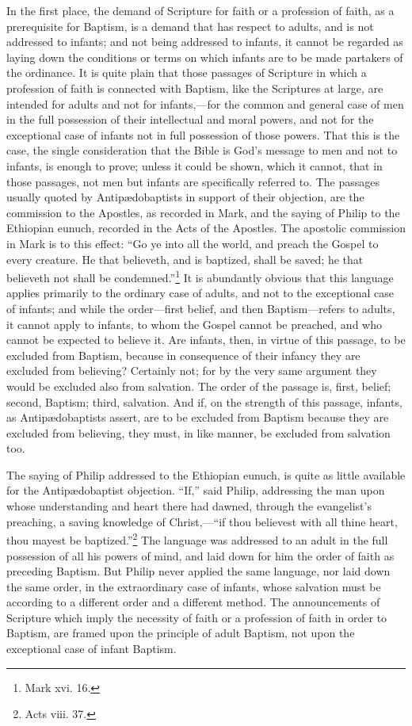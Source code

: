\documentclass[english,]{book}
\begin{document}
In the first place, the demand of Scripture for faith or a profession of faith, as a prerequisite for Baptism, is a demand that has respect to adults, and is not addressed to infants; and not being addressed to infants, it cannot be regarded as laying down the conditions or terms on which infants are to be made partakers of the ordinance. It is quite plain that those passages of Scripture in which a profession of faith is connected with Baptism, like the Scriptures at large, are intended for adults and not for infants,---for the common and general case of men in the full possession of their intellectual and moral powers, and not for the exceptional case of infants not in full possession of those powers. That this is the case, the single consideration that the Bible is God's message to men and not to infants, is enough to prove; unless it could be shown, which it cannot, that in those passages, not men but infants are specifically referred to. The passages usually quoted by Antipædobaptists in support of their objection, are the commission to the Apostles, as recorded in Mark, and the saying of Philip to the Ethiopian eunuch, recorded in the Acts of the Apostles. The apostolic commission in Mark is to this effect: ``Go ye into all the world, and preach the Gospel to every creature. He that believeth, and is baptized, shall be saved; he that believeth not shall be condemned.''\footnote{Mark xvi. 16.} It is abundantly obvious that this language applies primarily to the ordinary case of adults, and not to the exceptional case of infants; and while the order---first belief, and then Baptism---refers to adults, it cannot apply to infants, to whom the Gospel cannot be preached, and who cannot be expected to believe it. Are infants, then, in virtue of this passage, to be excluded from Baptism, because in consequence of their infancy they are excluded from believing? Certainly not; for by the very same argument they would be excluded also from salvation. The order of the passage is, first, belief; second, Baptism; third, salvation. And if, on the strength of this passage, infants, as Antipædobaptists assert, are to be excluded from Baptism because they are excluded from believing, they must, in like manner, be excluded from salvation too.

The saying of Philip addressed to the Ethiopian eunuch, is quite as little available for the Antipædobaptist objection. ``If,'' said Philip, addressing the man upon whose understanding and heart there had dawned, through the evangelist's preaching, a saving knowledge of Christ,---``if thou believest with all thine heart, thou mayest be baptized.''\footnote{Acts viii. 37.} The language was addressed to an adult in the full possession of all his powers of mind, and laid down for him the order of faith as preceding Baptism. But Philip never applied the same language, nor laid down the same order, in the extraordinary case of infants, whose salvation must be according to a different order and a different method. The announcements of Scripture which imply the necessity of faith or a profession of faith in order to Baptism, are framed upon the principle of adult Baptism, not upon the exceptional case of infant Baptism.
\end{document}

